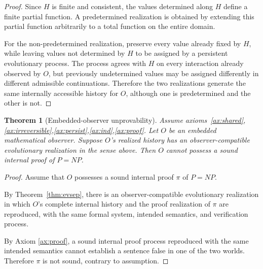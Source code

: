 \documentclass[11pt]{article}
\newtheorem{theorem}[definition]{Theorem}
\newcommand{\Aev}{\mathcal A}
\begin{document}
\begin{proof}
Since \(H\) is finite and consistent, the values determined along \(H\)
define a finite partial function. A predetermined realization is obtained
by extending this partial function arbitrarily to a total function on the
entire domain.

For the non-predetermined realization, preserve every value already fixed
by \(H\), while leaving values not determined by \(H\) to be assigned by a
persistent evolutionary process. The process agrees with \(H\) on every
interaction already observed by \(O\), but previously undetermined values
may be assigned differently in different admissible continuations.
Therefore the two realizations generate the same internally accessible
history for \(O\), although one is predetermined and the other is not.
\end{proof}




\begin{theorem}[Embedded-observer unprovability]\label{thm:main}
Assume axioms~\ref{ax:shared},\ref{ax:irreversible},\ref{ax:persist},\ref{ax:ind},\ref{ax:proof}.  Let \(O\) be an embedded
mathematical observer.  Suppose \(O\)'s realized history has an observer-compatible
evolutionary realization in the sense above.  Then \(O\) cannot possess a sound internal proof
of \(P=NP\).
\end{theorem}

\begin{proof}
Assume that \(O\) possesses a sound internal proof \(\pi\) of \(P=NP\). 

By Theorem~\ref{thm:evsep},
there is an observer-compatible evolutionary realization in which \(O\)'s complete internal
history and the proof realization of \(\pi\) are reproduced, with the same formal system,
intended semantics, and verification process.

By Axiom \ref{ax:proof}, a sound internal proof
process reproduced with the same intended semantics cannot establish a sentence false in one
of the two worlds.  Therefore \(\pi\) is not sound, contrary to assumption.
\end{proof}
\end{document}

